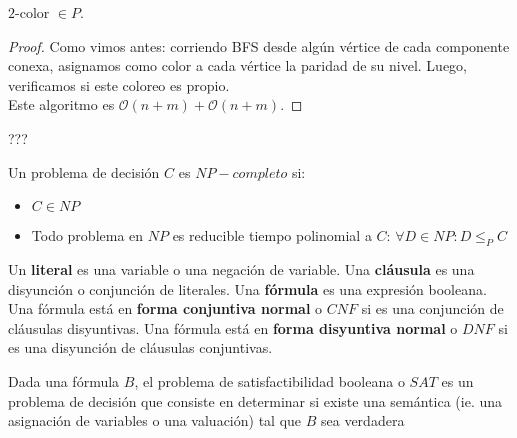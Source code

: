 \begin{proposition}
$2$-color $\in P$.
\end{proposition}

\begin{proof}
Como vimos antes: corriendo BFS desde algún vértice de cada componente conexa, asignamos como color a cada vértice la paridad de su nivel. Luego, verificamos si este coloreo es propio.\\
Este algoritmo es $\mathcal{O}(n+m) + \mathcal{O}(n+m)$.
\end{proof}

\begin{definition}
???
\end{definition}

\begin{definition}[$NP-Completo$]
Un problema de decisión $C$ es \textbf{$NP-completo$} si:
\begin{itemize}
    \item $C \in NP$
    \item Todo problema en $NP$ es reducible tiempo polinomial a $C$:
    $\forall D \in NP : D \le_{P} C$
\end{itemize}
\end{definition}

\begin{definition}
Un \textbf{literal} es una variable o una negación de variable.
Una \textbf{cláusula} es una disyunción o conjunción de literales.
Una \textbf{fórmula} es una expresión booleana.
Una fórmula está en \textbf{forma conjuntiva normal} o $CNF$ si es una conjunción de cláusulas disyuntivas.
Una fórmula está en \textbf{forma disyuntiva normal} o $DNF$ si es una disyunción de cláusulas conjuntivas.
\end{definition}

\begin{definition}[$SAT$]
Dada una fórmula $B$, el problema de satisfactibilidad booleana o $SAT$ es un problema de decisión que consiste en determinar si existe una semántica (ie. una asignación de variables o una valuación) tal que $B$ sea verdadera 
\end{definition}

